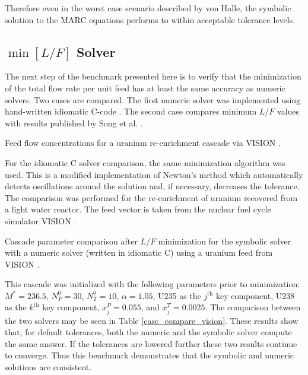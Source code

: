 \documentclass[preprint,12pt]{elsarticle}
\newcommand{\nuc}[2]{{#1}{#2}}
\newcommand{\jth}[0]{$j^{\mbox{th}}$ }
\newcommand{\kth}[0]{$k^{\mbox{th}}$ }
\begin{document}
Therefore even in the worst case scenario described by von Halle, the symbolic 
solution to the MARC equations performs to within acceptable tolerance levels.


\subsection{$\min\left[L/F\right]$ Solver}
\label{sec:minl-solver}

The next step of the benchmark presented here is to verify that the minimization
of the total flow rate per unit feed has at least the same accuracy as 
numeric solvers.  Two cases are compared.  The first numeric solver was implemented 
using hand-written idiomatic C-code \cite{pyne:enrichment}.  The second case compares
minimum $L/F$ values with results published by Song et al. 
\cite{doi:10.1080/01496391003793884}.

\begin{table}[htbp]
\begin{center}
\caption{Feed flow concentrations for a uranium re-enrichment cascade via  
    VISION \cite{Jacobson2009}.}

\label{feed_vision}
\end{center}
\end{table}

For the idiomatic C solver comparison, the same minimization algorithm was used.  
This is a modified implementation of Newton's method which automatically detects 
oscillations around the solution and, if necessary, decreases the tolerance.
The comparison was performed for the re-enrichment of  uranium recovered from 
a light water reactor.  The feed vector is taken from the
nuclear fuel cycle simulator VISION \cite{Jacobson2009}.

\begin{table}[htbp]
\begin{center}
\caption{Cascade parameter comparison after $L/F$ minimization for the symbolic 
    solver with a numeric solver (written in idiomatic C) using a uranium feed from 
    VISION \cite{Jacobson2009}.}

\label{casc_compare_vision}
\end{center}
\end{table}

This cascade was initialized with the following parameters prior to minimization: 
$M^*=236.5$, $N_P^0=30$, $N_T^0=10$, $\alpha=1.05$, \nuc{U}{235} as the \jth key 
component, \nuc{U}{238} as the \kth key component, $x_j^P=0.055$, and 
$x_j^T=0.0025$.  The comparison between the two solvers may be seen in Table
\ref{casc_compare_vision}.  These results show that, for default tolerances,
both the numeric and the symbolic solver compute the same answer. 
If the tolerances are lowered further these two results continue to converge.  
Thus this benchmark demonstrates that the symbolic and numeric solutions
are consistent.
\end{document}
